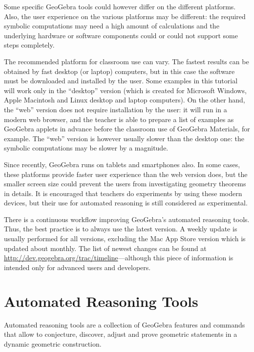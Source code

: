 \documentclass{article}
\begin{document}
Some specific GeoGebra tools could however differ on the different platforms. Also,  the user experience on the various platforms may be different: the required symbolic computations may need a high amount of calculations and the underlying hardware or software components could or could not support some steps completely.

The recommended platform for classroom use can vary. The fastest results can be obtained by fast desktop (or laptop) computers, but in this case the software must be downloaded and installed by the user. Some examples in this tutorial will work only in the ``desktop'' version (which is created for Microsoft Windows, Apple Macintosh and Linux desktop and laptop computers). On the other hand, the ``web'' version does not require installation by the user: it will run in a modern web browser, and the teacher is able to prepare a list of examples as GeoGebra applets in advance before the classroom use of GeoGebra Materials, for example. The ``web'' version is however usually slower than the desktop one: the symbolic computations may be slower by a magnitude.

Since recently, GeoGebra runs on tablets and smartphones also. In some cases, these platforms provide faster user experience than the web version does, but the smaller screen size could prevent the users from investigating geometry theorems in details. It is encouraged that teachers do experiments by using these modern devices, but their use for automated reasoning is still considered as experimental.

There is a continuous workflow improving GeoGebra's automated reasoning tools. Thus, the best practice is to always use the latest version. A weekly update is usually performed for all versions, excluding the Mac App Store version which is updated about monthly. The list of newest changes can be found at \url{http://dev.geogebra.org/trac/timeline}---although this piece of information is intended only for advanced users and developers.

\section{Automated Reasoning Tools}

Automated reasoning tools are a collection of GeoGebra features and commands that allow to conjecture, discover, adjust and prove geometric statements in a dynamic geometric construction.
\end{document}
